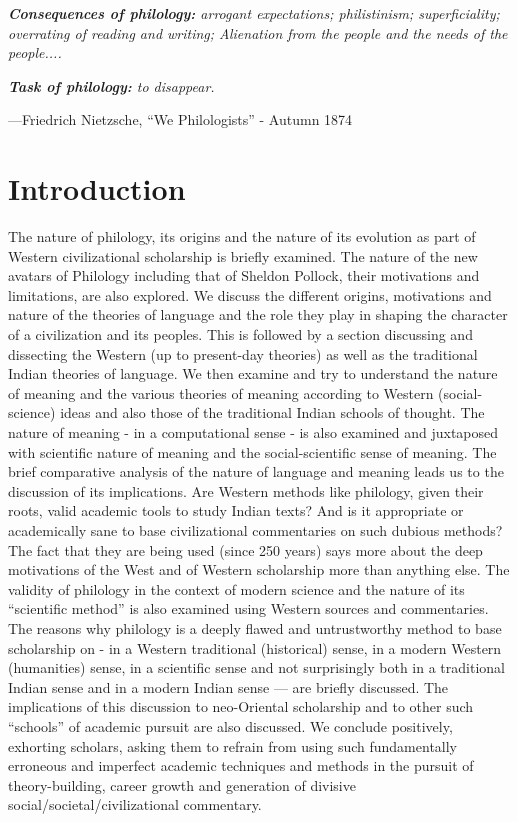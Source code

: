 \textit{\textbf{Consequences of philology:} arrogant expectations; philistinism; superficiality; overrating of reading and writing; Alienation from the people and the needs of the people.... }

\textit{\textbf{Task of philology:} to disappear.}

\hfill —Friedrich Nietzsche, “We Philologists” - Autumn 1874


\section*{Introduction}

The nature of philology, its origins and the nature of its evolution as part of Western civilizational scholarship is briefly examined. The nature of the new avatars of Philology including that of Sheldon Pollock, their motivations and limitations, are also explored. We discuss the different origins, motivations and nature of the theories of language and the role they play in shaping the character of a civilization and its peoples. This is followed by a section discussing and dissecting the Western (up to present-day theories) as well as the traditional Indian theories of language. We then examine and try to understand the nature of meaning and the various theories of meaning  according to Western (social-science) ideas and also those of the traditional Indian schools of thought. The nature of meaning - in a computational sense - is also examined and juxtaposed with scientific nature of meaning and the social-scientific sense of meaning. The brief comparative analysis of the nature of language and meaning leads us to the discussion of its implications. Are Western methods like philology, given their roots, valid academic tools to study Indian texts? And is it appropriate or academically sane to base civilizational commentaries on such dubious methods? The fact that they are being used (since 250 years) says more about the deep motivations of the West and of Western scholarship more than anything else. The validity of philology in the context of modern science and the nature of its “scientific method” is also examined using Western sources and commentaries. The reasons why philology is a deeply flawed and untrustworthy method to base scholarship on - in a Western traditional (historical) sense, in a modern Western (humanities) sense, in a scientific sense and not surprisingly both in a traditional Indian sense and in a modern Indian sense — are briefly discussed. The implications of this discussion to neo-Oriental scholarship and to other such “schools” of academic pursuit are also discussed. We conclude positively, exhorting scholars, asking them to refrain from using such fundamentally erroneous and imperfect academic techniques and methods in the pursuit of theory-building, career growth and generation of divisive social/societal/civilizational commentary.


